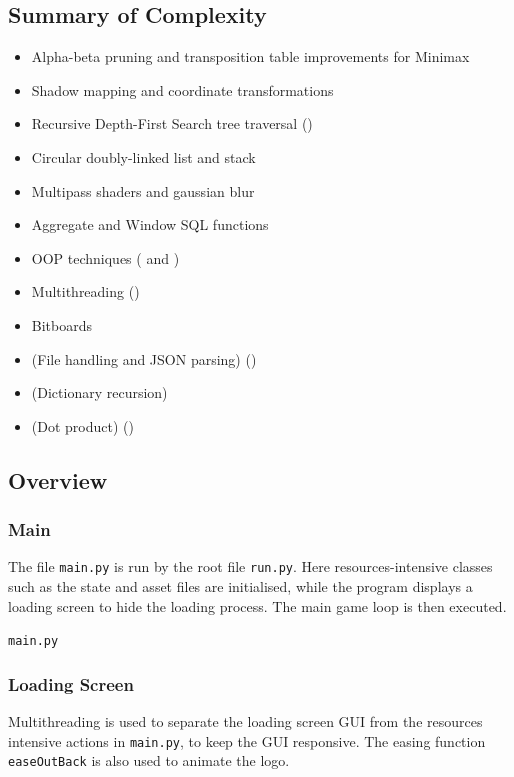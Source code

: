 \documentclass[../main/main.tex]{subfiles}
\begin{document}
\subsection{Summary of Complexity}
\begin{itemize}
\item Alpha-beta pruning and transposition table improvements for Minimax
\item Shadow mapping and coordinate transformations
\item Recursive Depth-First Search tree traversal ()
\item Circular doubly-linked list and stack
\item Multipass shaders and gaussian blur
\item Aggregate and Window SQL functions
\item OOP techniques ( and )
\item Multithreading ()
\item Bitboards
\item (File handling and JSON parsing) ()
\item (Dictionary recursion)
\item (Dot product) ()
\end{itemize}

\subsection{Overview}
\subsubsection{Main}
The file \lstinline{main.py} is run by the root file \lstinline{run.py}. Here resources-intensive classes such as the state and asset files are initialised, while the program displays a loading screen to hide the loading process. The main game loop is then executed.

\noindent\verb|main.py|


\subsubsection{Loading Screen}
\label{sec:loading-screen}
Multithreading is used to separate the loading screen GUI from the resources intensive actions in \lstinline{main.py}, to keep the GUI responsive. The easing function \lstinline{easeOutBack} is also used to animate the logo.
\end{document}
